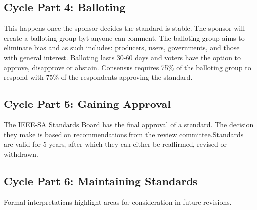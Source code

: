 \subsection*{Cycle Part 4: Balloting}
This happens once the sponsor decides the standard is stable. The sponsor will create a balloting group byt anyone can comment. The balloting group aims to eliminate bias and as such includes: producers, users, governments, and those with general interest. Balloting lasts 30-60 days and voters have the option to approve, disapprove or abstain. Consensus requires 75\% of the balloting group to respond with 75\% of the respondents approving the standard.
\subsection*{Cycle Part 5: Gaining Approval}
The IEEE-SA Standards Board has the final approval of a standard. The decision they make is based on recommendations from the review committee.Standards are valid for 5 years, after which they can either be reaffirmed, revised or withdrawn. 
\subsection*{Cycle Part 6: Maintaining Standards}
Formal interpretations highlight areas for consideration in future revisions. 